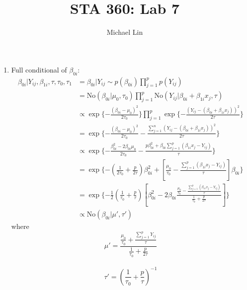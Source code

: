 \documentclass{article}
\title{STA 360: Lab 7}
\author{Michael Lin}
\begin{document}
\maketitle

\begin{enumerate}
	\item Full conditional of $\beta_{0i}$:
	\begin{align*}
		\beta_{0i}|Y_{ij},\beta_{1i}, \tau, \tau_0, \tau_1 &= \beta_{0i}|Y_{ij} \sim p(\beta_{0i})\prod_{j=1}^{p}p(Y_{ij}) \\
		&=\text{No}(\beta_{0i}|\mu_0, \tau_0)\prod_{j=1}^{p}\text{No}(Y_{ij}|\beta_{0i}+\beta_{1i}x_j, \tau) \\
		&\propto \exp\{-\frac{(\beta_{0i}-\mu_0)^2}{2\tau_0}\}\prod_{j=1}^{p}\exp\{-\frac{(Y_{ij}-(\beta_{0i}+\beta_{1i}x_j))^2}{2\tau}\} \\
		&=\exp\{-\frac{(\beta_{0i}-\mu_0)^2}{2\tau_0}-\frac{\sum\nolimits_{j=1}^n(Y_{ij}-(\beta_{0i}+\beta_{1i}x_j))^2}{2\tau}\} \\
		&\propto \exp\{-\frac{\beta_{0i}^2-2\beta_{0i}\mu_0}{2\tau_0}-\frac{p\beta_{0i}^2+\beta_{0i}\sum\nolimits_{j=1}^p(\beta_{1i}x_j-Y_{ij})}{\tau}\}\\
		&=\exp\{-(\frac{1}{2\tau_0}+\frac{p}{2\tau})\beta_{0i}^2+[\frac{\mu_0}{\tau_0}-\frac{\sum\nolimits_{j=1}^p(\beta_{1i}x_j-Y_{ij})}{\tau}]\beta_{0i}\}\\
		&=\exp\{-\frac{1}{2}(\frac{1}{\tau_0}+\frac{p}{\tau})[\beta_{0i}^2-2\beta_{0i}\frac{\frac{\mu_0}{\tau_0}-\frac{\sum\nolimits_{j=1}^p(\beta_{1i}x_j-Y_{ij})}{\tau}}{\frac{1}{\tau_0}+\frac{p}{2\tau}}]\} \\
		&\propto \text{No}(\beta_{0i}|\mu', \tau')
	\end{align*}
	where
	$$\mu'= \frac{\frac{\mu_0}{\tau_0}+\frac{\sum\nolimits_{j=1}^pY_{ij}}{\tau}}{\frac{1}{\tau_0}+\frac{p}{2\tau}} $$\\
	$$\tau' = (\frac{1}{\tau_0}+\frac{p}{\tau})^{-1} $$
	

\end{enumerate}
\end{document}
